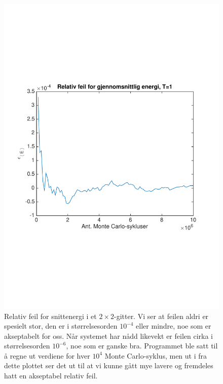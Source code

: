 \documentclass[norsk, 10pt]{article}
\begin{document}
\begin{figure}[H]
\centering
\includegraphics[scale = 0.5, trim = 1cm 8cm 1cm 8cm]{b_rel_err_avgEnergy_L2_T1.pdf}
\caption{Relativ feil for snittenergi i et $2\times2$-gitter. Vi ser at feilen aldri er spesielt stor, den er i størrelsesorden $10^{-4}$ eller mindre, noe som er akseptabelt for oss. Når systemet har nådd likevekt er feilen cirka i størrelsesorden $10^{-6}$, noe som er ganske bra. Programmet ble satt til å regne ut verdiene for hver $10^4$ Monte Carlo-syklus, men ut i fra dette plottet ser det ut til at vi kunne gått mye lavere og fremdeles hatt en akseptabel relativ feil.}
\label{fig:errenergyT1L2}
\end{figure}
\end{document}
